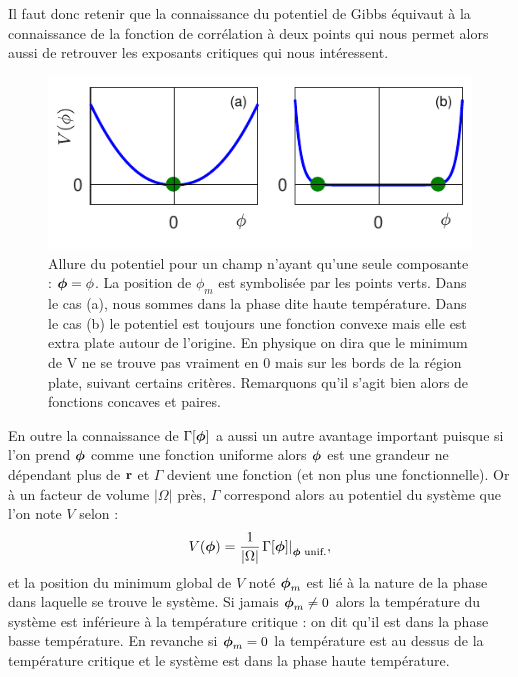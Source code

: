 \documentclass[10pt]{article}
\begin{document}
\begin{multicols}{2}
Il faut donc retenir que la connaissance du potentiel de Gibbs équivaut à la connaissance de la fonction de corrélation à deux points qui nous permet alors aussi de retrouver les exposants critiques qui nous intéressent. 

\begin{figure}[H]
\begin{center}
\includegraphics[width=0.95\columnwidth]{CourbePot1.pdf}
\caption{Allure du potentiel pour un champ n'ayant qu'une seule composante : $\boldsymbol{ \phi} = \phi$. La position de $\phi_m$ est symbolisée par les points verts. Dans le cas (a), nous sommes dans la phase dite haute température. Dans le cas (b) le potentiel est toujours une fonction convexe mais elle est extra plate autour de l'origine. En physique on dira que le minimum de V ne se trouve pas vraiment en $0$ mais sur les bords de la région plate, suivant certains critères. Remarquons qu'il s'agit bien alors de fonctions concaves et paires.}
\end{center}
\end{figure}
\vspace*{-11pt}

En outre la connaissance de $\Gamma[\boldsymbol{ \phi}]$ a aussi un autre avantage important puisque si l'on prend $\boldsymbol{ \phi}$ comme une fonction uniforme alors $\boldsymbol{ \phi}$ est une grandeur ne dépendant plus de ${\bf r}$ et $\Gamma$ devient une fonction (et non plus une fonctionnelle). Or à un facteur de volume $|\Omega|$ près, $\Gamma$ correspond alors au potentiel du système que l'on note $V$ selon :
\begin{equation}
	V(\boldsymbol{ \phi}) = \frac{1}{|\Omega|}{\left. \Gamma[\boldsymbol{ \phi}] \right|}_{\boldsymbol{ \phi} \text{ unif.}},
\end{equation}
et la position du minimum global de $V$ noté $\boldsymbol{ \phi}_m$ est lié à la nature de la phase dans laquelle se trouve le système. Si jamais $\boldsymbol{ \phi}_m \neq 0$ alors la température du système est inférieure à la température critique : on dit qu'il est dans la phase basse température. En revanche si  $\boldsymbol{ \phi}_m = 0$ la température est au dessus de la température critique et le système est dans la phase haute température.\\




\end{multicols}
\end{document}
